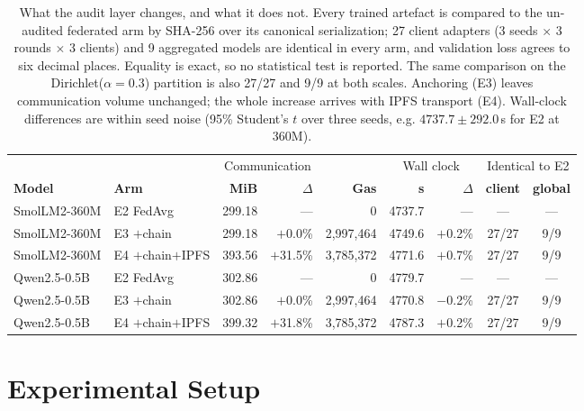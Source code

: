 \documentclass[11pt]{article}
\begin{document}
\begin{table}[t]
\centering
\small
\setlength{\tabcolsep}{4pt}
\begin{tabular}{llrrrrrcc}
\toprule
 & & \multicolumn{2}{c}{Communication} & & \multicolumn{2}{c}{Wall clock} & \multicolumn{2}{c}{Identical to E2} \\
\cmidrule(lr){3-4}\cmidrule(lr){6-7}\cmidrule(lr){8-9}
\textbf{Model} & \textbf{Arm} & \textbf{MiB} & \textbf{$\Delta$} & \textbf{Gas} & \textbf{s} & \textbf{$\Delta$} & \textbf{client} & \textbf{global} \\
\midrule
SmolLM2-360M & E2 FedAvg          & 299.18 & ---        & 0         & 4737.7 & ---        & ---   & --- \\
SmolLM2-360M & E3 $+$chain        & 299.18 & $+$0.0\%   & 2{,}997{,}464 & 4749.6 & $+$0.2\%   & 27/27 & 9/9 \\
SmolLM2-360M & E4 $+$chain$+$IPFS & 393.56 & $+$31.5\%  & 3{,}785{,}372 & 4771.6 & $+$0.7\%   & 27/27 & 9/9 \\
\midrule
Qwen2.5-0.5B & E2 FedAvg          & 302.86 & ---        & 0         & 4779.7 & ---        & ---   & --- \\
Qwen2.5-0.5B & E3 $+$chain        & 302.86 & $+$0.0\%   & 2{,}997{,}464 & 4770.8 & $-$0.2\%   & 27/27 & 9/9 \\
Qwen2.5-0.5B & E4 $+$chain$+$IPFS & 399.32 & $+$31.8\%  & 3{,}785{,}372 & 4787.3 & $+$0.2\%   & 27/27 & 9/9 \\
\bottomrule
\end{tabular}
\caption{What the audit layer changes, and what it does not. Every trained artefact is compared to the un-audited federated arm by SHA-256 over its canonical serialization; 27 client adapters (3 seeds $\times$ 3 rounds $\times$ 3 clients) and 9 aggregated models are identical in every arm, and validation loss agrees to six decimal places. Equality is exact, so no statistical test is reported. The same comparison on the Dirichlet($\alpha{=}0.3$) partition is also 27/27 and 9/9 at both scales. Anchoring (E3) leaves communication volume unchanged; the whole increase arrives with IPFS transport (E4). Wall-clock differences are within seed noise (95\% Student's $t$ over three seeds, e.g. $4737.7 \pm 292.0$\,s for E2 at 360M).}
\label{tab:audit}
\end{table}

\section{Experimental Setup}
\end{document}
